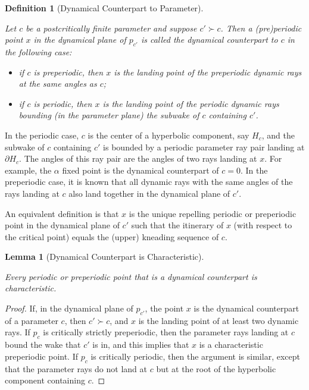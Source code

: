 \documentclass[12pt]{amsart}
\newcommand{\0}{\texttt{0}}
\newcommand{\1}{\texttt{1}}
\newtheorem{lemma}[theorem]{Lemma}
\newtheorem{definition}[theorem]{Definition}
\theoremstyle{definition}
\numberwithin{equation}{section}
\newcommand{\lineclear}{\rule{0pt}{2pt}\newline}
\begin{document}

\begin{definition}[Dynamical Counterpart to Parameter]
\label{Def:DynamCounterpart} \lineclear
Let $c$ be a postcritically finite parameter and suppose $c'\succ c$. Then a (pre)periodic point $x$ in the dynamical plane of $p_{c'}$ is called the \emph{dynamical counterpart to $c$} in the following case:
\begin{itemize}
\item
if $c$ is preperiodic, then $x$ is the landing point of the preperiodic dynamic rays at the same angles as $c$;
\item
if $c$ is periodic, then $x$ is the landing point of the periodic dynamic rays bounding (in the parameter plane) the subwake of $c$ containing $c'$.
\end{itemize} 
\end{definition}


In the periodic case, $c$ is the center of a hyperbolic component, say $H_c$, and the subwake of $c$ containing $c'$ is bounded by a periodic parameter ray pair landing at $\partial H_c$. The angles of this ray pair are the angles of two rays landing at $x$. For example, the $\alpha$ fixed point is the dynamical counterpart of $c=0$. In the preperiodic case, it is known that all dynamic rays with the same angles of the rays landing at $c$ also land together in the dynamical plane of $c'$.

An equivalent definition is that $x$ is the unique repelling periodic or preperiodic point in the dynamical plane of $c'$ such that the itinerary of $x$ (with respect to the critical point) equals the (upper) kneading sequence of $c$. 


\begin{lemma}[Dynamical Counterpart is Characteristic]
\label{Lem:DynCounterpartCharacteristic} \lineclear
Every periodic or preperiodic point that is a dynamical counterpart is characteristic. 
\end{lemma}
\begin{proof}
If, in the dynamical plane of $p_{c'}$, the point $x$ is the dynamical counterpart of a parameter $c$, then $c'\succ c$, and $x$ is the landing point of at least two dynamic rays. If $p_c$ is critically strictly preperiodic, then the parameter rays landing at $c$ bound the wake that $c'$ is in, and this implies that $x$ is a characteristic preperiodic point. If $p_c$ is critically periodic, then the argument is similar, except that the parameter rays do not land at $c$ but at the root of the hyperbolic component containing $c$.
\end{proof}
\end{document}
